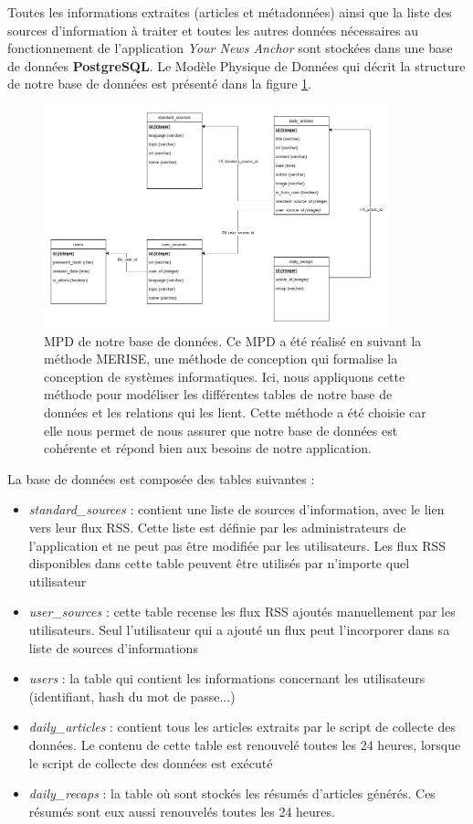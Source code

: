 \documentclass[french]{article}
\begin{document}
    Toutes les informations extraites (articles et métadonnées) ainsi que la liste des sources d'information à traiter et toutes les autres données nécessaires au fonctionnement de l'application \textit{Your News Anchor} sont stockées dans une base de données \textbf{PostgreSQL}. Le Modèle Physique de Données qui décrit la structure de notre base de données est présenté dans la figure \ref{fig:mpd}. 


    \begin{figure}[h]
        \includegraphics[width=10cm]{mpd_e1}
        \centering
        \caption{MPD de notre base de données. Ce MPD a été réalisé en suivant la méthode MERISE, une méthode de conception qui formalise la conception de systèmes informatiques. Ici, nous appliquons cette méthode pour modéliser les différentes tables de notre base de données et les relations qui les lient. Cette méthode a été choisie car elle nous permet de nous assurer que notre base de données est cohérente et répond bien aux besoins de notre application.}
        \label{fig:mpd}
        \centering
    \end{figure}


    La base de données est composée des tables suivantes :
    \begin{itemize}
        \item \textit{standard\_sources} : contient une liste de sources d'information, avec le lien vers leur flux RSS. Cette liste est définie par les administrateurs de l'application et ne peut pas être modifiée par les utilisateurs. Les flux RSS disponibles dans cette table peuvent être utilisés par n'importe quel utilisateur
        \item \textit{user\_sources} : cette table recense les flux RSS ajoutés manuellement par les utilisateurs. Seul l'utilisateur qui a ajouté un flux peut l'incorporer dans sa liste de sources d'informations
        \item \textit{users} : la table qui contient les informations concernant les utilisateurs (identifiant, hash du mot de passe...)
        \item \textit{daily\_articles} : contient tous les articles extraits par le script de collecte des données. Le contenu de cette table est renouvelé toutes les 24 heures, lorsque le script de collecte des données est exécuté
        \item \textit{daily\_recaps} : la table où sont stockés les résumés d'articles générés. Ces résumés sont eux aussi renouvelés toutes les 24 heures.
    \end{itemize}
\end{document}
